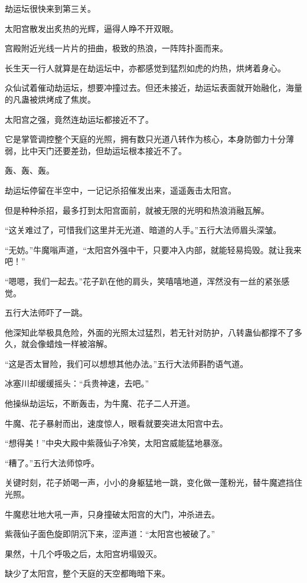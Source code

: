 \begin{this_body}
劫运坛很快来到第三关。

太阳宫散发出炙热的光辉，逼得人睁不开双眼。

宫殿附近光线一片片的扭曲，极致的热浪，一阵阵扑面而来。

长生天一行人就算是在劫运坛中，亦都感觉到猛烈如虎的灼热，烘烤着身心。

众仙试着催动劫运坛，想要冲撞过去。但还未接近，劫运坛表面就开始融化，海量的凡蛊被烘烤成了焦炭。

太阳宫之强，竟然连劫运坛都接近不了。

它是掌管调控整个天庭的光照，拥有数只光道八转作为核心，本身防御力十分薄弱，比中天门还要差劲，但劫运坛根本接近不了。

轰、轰、轰。

劫运坛停留在半空中，一记记杀招催发出来，遥遥轰击太阳宫。

但是种种杀招，最多打到太阳宫面前，就被无限的光明和热浪消融瓦解。

“这关难过了，可惜我们这里并无光道、暗道的人手。”五行大法师眉头深皱。

“无妨。”牛魔嗡声道，“太阳宫外强中干，只要冲入内部，就能轻易捣毁。就让我来吧！”

“嗯嗯，我们一起去。”花子趴在他的肩头，笑嘻嘻地道，浑然没有一丝的紧张感觉。

五行大法师吓了一跳。

他深知此举极具危险，外面的光照太过猛烈，若无针对防护，八转蛊仙都撑不了多久，就会像蜡烛一样被溶解。

“这是否太冒险，我们可以想想其他办法。”五行大法师斟酌语气道。

冰塞川却缓缓摇头：“兵贵神速，去吧。”

他操纵劫运坛，不断轰击，为牛魔、花子二人开道。

牛魔、花子暴射而出，速度惊人，眼看就要突进太阳宫中去。

“想得美！”中央大殿中紫薇仙子冷笑，太阳宫威能猛地暴涨。

“糟了。”五行大法师惊呼。

关键时刻，花子娇喝一声，小小的身躯猛地一跳，变化做一蓬粉光，替牛魔遮挡住光照。

牛魔悲壮地大吼一声，只身撞破太阳宫的大门，冲杀进去。

紫薇仙子面色旋即阴沉下来，涩声道：“太阳宫也被破了。”

果然，十几个呼吸之后，太阳宫坍塌毁灭。

缺少了太阳宫，整个天庭的天空都晦暗下来。


\end{this_body}

